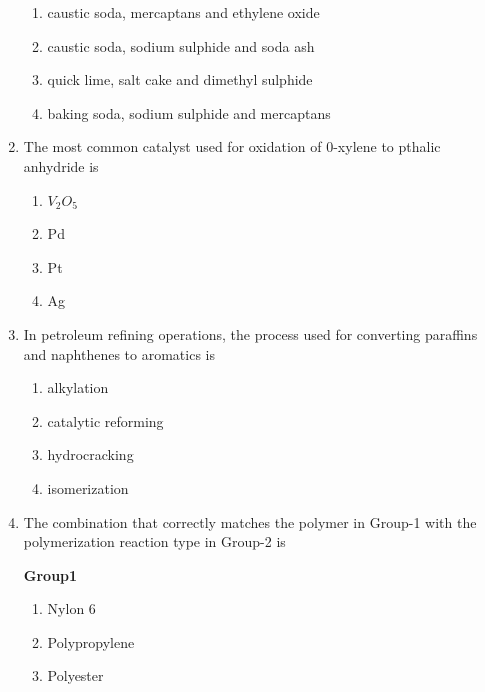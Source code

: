 \documentclass[journal,12pt,onecolumn]{IEEEtran}
\theoremstyle{remark}
\begin{document}
\begin{enumerate}
 \hfill{}
 
\begin{enumerate}
    \item caustic soda, mercaptans and ethylene oxide
    \item caustic soda, sodium sulphide and soda ash
    \item quick lime, salt cake and dimethyl sulphide
    \item baking soda, sodium sulphide and mercaptans
\end{enumerate}

    \item
        The most common catalyst used for oxidation of 0-xylene to pthalic anhydride is
        
  \hfill{}
\begin{enumerate}
    \item $V_2 O_5$
    \item Pd
    \item Pt
    \item Ag
\end{enumerate}

    \item In petroleum refining operations, the process used for converting paraffins and naphthenes to aromatics is
    
 \hfill{}
 
\begin{enumerate}
    \item alkylation
    \item catalytic reforming
    \item hydrocracking
    \item isomerization
\end{enumerate}


    \item The combination that correctly matches the polymer in Group-1 with the polymerization reaction type in Group-2 is
    
 \hfill{}
 
\begin{multicols}{2}
    \textbf{Group1}
    \begin{enumerate}[label=(\Alph*)]
        \item Nylon 6
        \item Polypropylene
        \item Polyester
    \end{enumerate}
\columnbreak


\end{multicols}
\end{enumerate}
\end{document}

